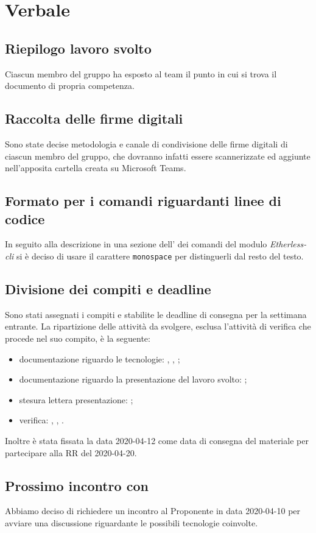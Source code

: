 \section{Verbale}
	
	\subsection{Riepilogo lavoro svolto}
		Ciascun membro del gruppo ha esposto al team il punto in cui si trova il documento di propria competenza.

	\subsection{Raccolta delle firme digitali}
		Sono state decise metodologia e canale di condivisione delle firme digitali di ciascun membro del gruppo, che dovranno infatti essere scannerizzate ed aggiunte nell'apposita cartella creata su Microsoft Teams.
		
	\subsection{Formato per i comandi riguardanti linee di codice}
		In seguito alla descrizione in una sezione dell'\AdR{} dei comandi del modulo \textit{Etherless-cli} si è deciso di usare il carattere \texttt{monospace} per distinguerli dal resto del testo.
				
	\subsection{Divisione dei compiti e deadline}
		Sono stati assegnati i compiti e stabilite le deadline di consegna per la settimana entrante. La ripartizione delle attività da svolgere, esclusa l'attività di verifica che procede nel suo compito, è la seguente:
		\begin{itemize}
			\item{documentazione riguardo le tecnologie: \AS, \EG, \FJ;}
			\item{documentazione riguardo la presentazione del lavoro svolto: \NF;}
			\item{stesura lettera presentazione: \VB;}
			\item{verifica: \AZ, \LB, \MP.}
		\end{itemize}
		Inoltre è stata fissata la data 2020-04-12 come data di consegna del materiale per partecipare alla RR del 2020-04-20.

	\subsection{Prossimo incontro con \Proponente{}}
	    Abbiamo deciso di richiedere un incontro al Proponente in data 2020-04-10 per avviare una discussione riguardante le possibili tecnologie coinvolte. 

